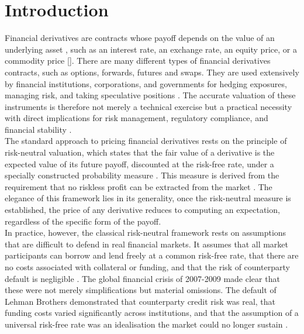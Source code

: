 \chapter{Introduction}
    Financial derivatives are contracts whose payoff depends on the value of an underlying asset , such as an interest rate, an exchange rate, an equity price, or a commodity price [\cite{blyth2014introduction}]. There are many different types of financial derivatives contracts, such as options, forwards, futures and swaps. They are used extensively by financial institutions, corporations, and governments for hedging exposures, managing risk, and taking speculative positions \cite{hull2022options}. The accurate valuation of these instruments is therefore not merely a technical exercise but a practical necessity with direct implications for risk management, regulatory compliance, and financial stability \cite{bcbs2010basel3}. \\

    \noindent
    The standard approach to pricing financial derivatives rests on the principle of risk-neutral valuation, which states that the fair value of a derivative is the expected value of its future payoff, discounted at the risk-free rate, under a specially constructed probability measure \cite{black1973pricing, cox1976valuation}. This measure is derived from the requirement that no riskless profit can be extracted from the market \cite{harrison1979martingales, harrison1981martingales}. The elegance of this framework lies in its generality, once the risk-neutral measure is established, the price of any derivative reduces to computing an expectation, regardless of the specific form of the payoff. \\

    \noindent
    In practice, however, the classical risk-neutral framework rests on assumptions that are difficult to defend in real financial markets. It assumes that all market participants can borrow and lend freely at a common risk-free rate, that there are no costs associated with collateral or funding, and that the risk of counterparty default is negligible \cite{Gregory_2015}. The global financial crisis of 2007-2009 made clear that these were not merely simplifications but material omissions. The default of Lehman Brothers demonstrated that counterparty credit risk was real, that funding costs varied significantly across institutions, and that the assumption of a universal risk-free rate was an idealisation the market could no longer sustain \cite{Gregory_2015, Green_2016}. \\


